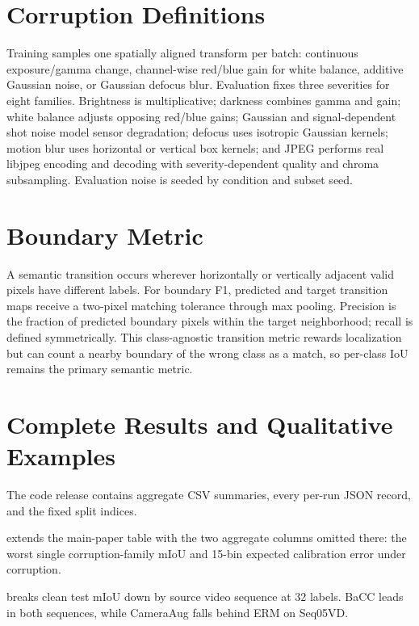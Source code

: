 \documentclass[runningheads]{llncs}
\begin{document}
\section{Corruption Definitions}

Training samples one spatially aligned transform per batch: continuous
exposure/gamma change, channel-wise red/blue gain for white balance, additive
Gaussian noise, or Gaussian defocus blur. Evaluation fixes three severities for
eight families. Brightness is multiplicative; darkness combines gamma and gain;
white balance adjusts opposing red/blue gains; Gaussian and signal-dependent
shot noise model sensor degradation; defocus uses isotropic Gaussian kernels;
motion blur uses horizontal or vertical box kernels; and JPEG performs real
libjpeg encoding and decoding with severity-dependent quality and chroma
subsampling. Evaluation noise is seeded by condition and subset seed.

\section{Boundary Metric}

A semantic transition occurs wherever horizontally or vertically adjacent
valid pixels have different labels. For boundary F1, predicted and target
transition maps receive a two-pixel matching tolerance through max pooling.
Precision is the fraction of predicted boundary pixels within the target
neighborhood; recall is defined symmetrically. This class-agnostic transition
metric rewards localization but can count a nearby boundary of the wrong class
as a match, so per-class IoU remains the primary semantic metric.

\section{Complete Results and Qualitative Examples}

The code release contains aggregate CSV summaries, every per-run JSON record,
and the fixed split indices.

 extends the main-paper table with the two aggregate
columns omitted there: the worst single corruption-family mIoU and 15-bin
expected calibration error under corruption.


 breaks clean test mIoU down by source video sequence at
32 labels. BaCC leads in both sequences, while CameraAug falls behind
ERM on Seq05VD.
\end{document}
